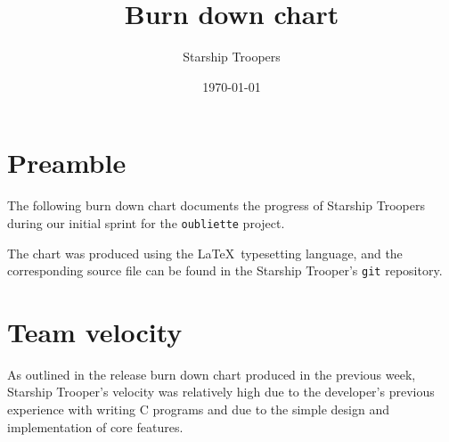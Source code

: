 \documentclass[a4paper,12pt,landscape]{article}
\title{Burn down chart}
\author{Starship Troopers}
\date{\today}
\begin{document}
\maketitle

\section*{Preamble}
The following burn down chart documents the progress of Starship
Troopers during our initial sprint for the \texttt{oubliette} project.

The chart was produced using the \LaTeX\ typesetting language, and
the corresponding source file can be found in the Starship Trooper's
\texttt{git} repository.

\section*{Team velocity}
As outlined in the release burn down chart produced in the previous
week, Starship Trooper's velocity was relatively high due to the
developer's previous experience with writing C programs and due
to the simple design and implementation of core features.

\end{document}
